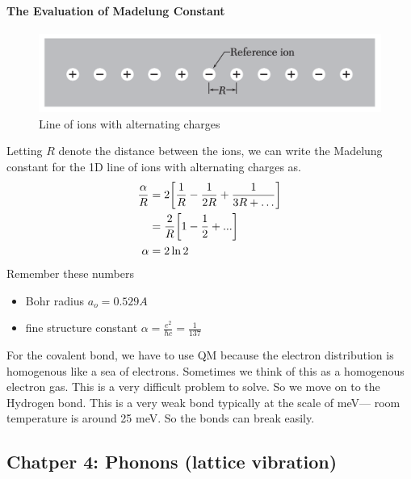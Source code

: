 \documentclass[../main.tex]{subfiles}
\begin{document}
\paragraph{The Evaluation of Madelung Constant}
\begin{figure}[ht]
    \centering
    \includegraphics[width=0.4\linewidth]{ionline.png}
    \caption{Line of ions with alternating charges}
    \label{fig:4.1}
\end{figure}
Letting $R$ denote the distance between the ions, we can write the Madelung constant for the 1D line
of ions with alternating charges as.
\begin{align*}
    \frac{\alpha}{R} &= 2\qt[
        \frac{1}{R} - \frac{1}{2R} + \frac{1}{3R + \dots}
    ] \\
    &= \frac{2}{R} \qt[1 - \frac{1}{2} +...] \\
    \alpha &= 2 \ln{2} 
\end{align*}
Remember these numbers
\begin{itemize}
    \item Bohr radius $a_o = 0.529 {A}$
    \item fine structure constant $\alpha = \frac{e^2}{\hbar c} = \frac{1}{137}$
\end{itemize}
For the covalent bond, we have to use QM because the electron distribution is homogenous like
a sea of electrons. Sometimes we think of this as a homogenous electron gas. This is a very
difficult problem to solve. So we move on to the Hydrogen bond. This is a very weak bond typically
at the scale of meV--- room temperature is around 25 meV. So the bonds can break easily.

\pagebreak
\subsection*{Chatper 4: Phonons (lattice vibration)}
\end{document}
